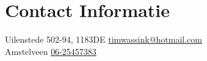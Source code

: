 \section{\sc Contact Informatie}
Uilenstede 502-94, 1183DE      \hfill \href{mailto:timwassink@hotmail.com}{timwassink@hotmail.com}\\
Amstelveen							 \hfill \href{tel:+31625457383}{06-25457383}\\


